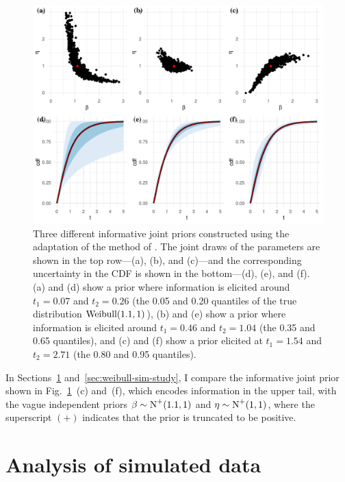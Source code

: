 \begin{figure}[t]
    \centering
    \includegraphics[width=1\textwidth]{./figures/ch-2/joint-priors.pdf}
    \caption{Three different informative joint priors constructed using the adaptation of the method of \citet{kaminskiy2005}. The joint draws of the parameters are shown in the top row---(a), (b), and (c)---and the corresponding uncertainty in the CDF is shown in the bottom---(d), (e), and (f). (a) and (d) show a prior where information is elicited around $t_1 = 0.07$ and $t_2 = 0.26$ (the 0.05 and 0.20 quantiles of the true distribution $\hbox{Weibull}(1.1, 1)$), (b) and (e) show a prior where information is elicited around $t_1 = 0.46$ and $t_2 = 1.04$ (the 0.35 and 0.65 quantiles), and (c) and (f) show a prior elicited at $t_1 = 1.54$ and $t_2 = 2.71$ (the 0.80 and 0.95 quantiles).}
    \label{fig:kaminskiy-join-priors}
\end{figure}

In Sections~\ref{sec:weibull-sim-example} and~\ref{sec:weibull-sim-study}, I compare the informative joint prior shown in Fig.~\ref{fig:kaminskiy-join-priors}~(c) and~(f), which encodes information in the upper tail, with the vague independent priors $\beta \sim \hbox{N}^{+}(1.1, 1)$ and $\eta \sim \hbox{N}^{+}(1, 1)$, where the superscript $(+)$ indicates that the prior is truncated to be positive. 

\section{Analysis of simulated data} \label{sec:weibull-sim-example}

